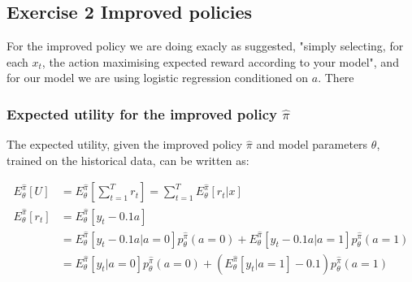 
\subsection{Exercise 2 Improved policies}

For the improved policy we are doing exacly as suggested, "simply selecting, for each \(x_t\), the action maximising expected reward according to your model", and for our model we are using logistic regression conditioned on \(a\).
There

\subsubsection{Expected utility for the improved policy \(\hat{\pi}\)}

The expected utility, given the improved policy \(\hat{\pi}\) and model parameters \(\theta\), trained on the historical data, can be written as:

\begin{equation}
    \begin{align}
        E_\theta^{\hat{\pi}}[U]   & = E_\theta^{\hat{\pi}}[\sum_{t=1}^T r_t] = \sum_{t=1}^T E_\theta^{\hat{\pi}}[r_t | x]                                                     \\
        E_\theta^{\hat{\pi}}[r_t] & = E_\theta^{\hat{\pi}}[y_t - 0.1a]                                                                                                        \\
                                  & = E_\theta^{\hat{\pi}}[y_t - 0.1a | a=0] p_\theta^{\hat{\pi}}(a=0) + E_\theta^{\hat{\pi}}[y_t - 0.1a | a=1] p_\theta^{\hat{\pi}}(a=1)     \\
                                  & = E_\theta^{\hat{\pi}}[y_t | a=0] p_\theta^{\hat{\pi}}(a=0) + \left(E_\theta^{\hat{\pi}}[y_t| a=1] -0.1 \right) p_\theta^{\hat{\pi}}(a=1) \\
    \end{align}
\end{equation}